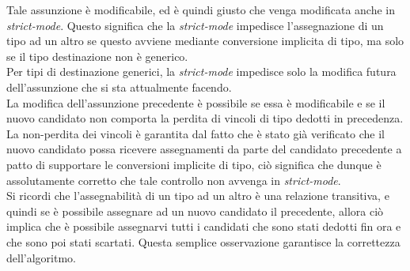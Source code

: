 Tale assunzione è modificabile, ed è quindi giusto che venga modificata anche in \textit{strict-mode}. Questo 
significa che la \textit{strict-mode} impedisce l'assegnazione di un tipo ad un altro se questo avviene mediante 
conversione implicita di tipo, ma solo se il tipo destinazione non è generico. \\

Per tipi di destinazione generici, la \textit{strict-mode} impedisce solo la modifica futura dell'assunzione 
che si sta attualmente facendo. \\

La modifica dell'assunzione precedente è possibile se essa è modificabile e se il nuovo candidato 
non comporta la perdita di vincoli di tipo dedotti in precedenza. La non-perdita dei vincoli è garantita
dal fatto che è stato già verificato che il nuovo candidato possa ricevere assegnamenti da parte del candidato 
precedente a patto di supportare le conversioni implicite di tipo, ciò significa che dunque è assolutamente corretto 
che tale controllo non avvenga in \textit{strict-mode}. \\

Si ricordi che l'assegnabilità di un tipo ad un altro è una relazione transitiva, e quindi se è possibile assegnare 
ad un nuovo candidato il precedente, allora ciò implica che è possibile assegnarvi tutti i candidati che sono 
stati dedotti fin ora e che sono poi stati scartati. Questa semplice osservazione garantisce la correttezza 
dell'algoritmo. \\